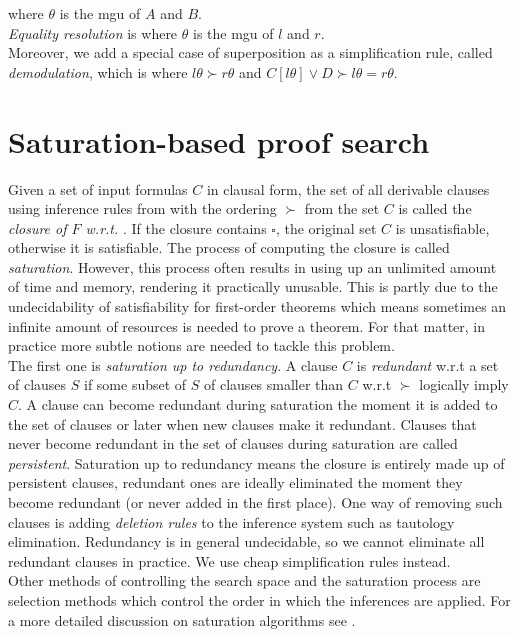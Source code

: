 where $\theta$ is the mgu of $A$ and $B$.\medskip\\
\textit{Equality resolution} is
where $\theta$ is the mgu of $l$ and $r$.\medskip\\
Moreover, we add a special case of superposition as a simplification rule, called \textit{demodulation}, which is
where $l\theta\succ r\theta$ and $C[l\theta]\lor D\succ l\theta=r\theta$.
\section{Saturation-based proof search}
Given a set of input formulas $C$ in clausal form, the set of all derivable clauses using inference rules from \Sup with the ordering $\succ$ from the set $C$ is called the \textit{closure of $F$ w.r.t. \Sup}. If the closure contains $\square$, the original set $C$ is unsatisfiable, otherwise it is satisfiable. The process of computing the closure is called \textit{saturation}. However, this process often results in using up an unlimited amount of time and memory, rendering it practically unusable. This is partly due to the undecidability of satisfiability for first-order theorems \cite{godel} which means sometimes an infinite amount of resources is needed to prove a theorem. For that matter, in practice more subtle notions are needed to tackle this problem.\medskip\\
The first one is \textit{saturation up to redundancy}. A clause $C$ is \textit{redundant} w.r.t a set of clauses $S$ if some subset of $S$ of clauses smaller than $C$ w.r.t $\succ$ logically imply $C$. A clause can become redundant during saturation the moment it is added to the set of clauses or later when new clauses make it redundant. Clauses that never become redundant in the set of clauses during saturation are called \textit{persistent}. Saturation up to redundancy means the closure is entirely made up of persistent clauses, redundant ones are ideally eliminated the moment they become redundant (or never added in the first place). One way of removing such clauses is adding \textit{deletion rules} to the inference system such as tautology elimination. Redundancy is in general undecidable, so we cannot eliminate all redundant clauses in practice. We use cheap simplification rules instead.\medskip\\
Other methods of controlling the search space and the saturation process are selection methods which control the order in which the inferences are applied. For a more detailed discussion on saturation algorithms see \cite{cav13}.

